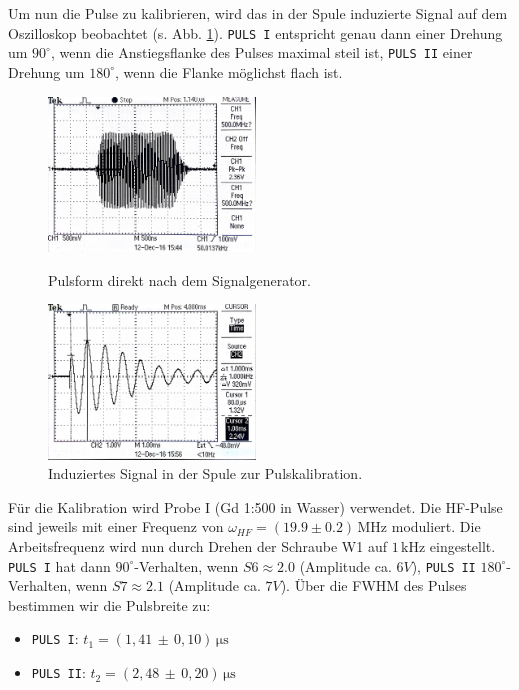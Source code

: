 \documentclass[a4paper]{scrartcl} %
\newcommand{\err}[2]{( #1 \, \pm \, #2 )} %
\newcommand{\us}{\, \mathrm{\mu s}}
\newcommand{\khz}{\, \mathrm{kHz}}
\newcommand{\mhz}{\, \mathrm{MHz}}
\begin{document}
Um nun die Pulse zu kalibrieren, wird das in der Spule induzierte Signal auf dem Oszilloskop beobachtet (s. Abb. \ref{fig:pulse_induced}). \texttt{PULS I} entspricht genau dann einer Drehung um $90^\circ$, wenn die Anstiegsflanke des Pulses maximal steil ist, \texttt{PULS II} einer Drehung um $180^\circ$, wenn die Flanke möglichst flach ist.
\newline
\begin{figure}[H]
	\centering
	\parbox{60mm}{
		\centering
		\includegraphics[width=55mm]{./Resources/pulse_train.jpg}
		\caption{Pulsform direkt nach dem Signalgenerator.}
		\label{fig:pulse_signal}
	}
	\hfill  %
	\parbox{60mm}{
		\centering
		\includegraphics[width=55mm]{./Resources/single_pulse_event.jpg}
		\caption{Induziertes Signal in der Spule zur Pulskalibration.}
		\label{fig:pulse_induced}
	}
\end{figure}

Für die Kalibration wird Probe I (Gd 1:500 in Wasser) verwendet. Die HF-Pulse sind jeweils mit einer Frequenz von $\omega_{HF} = (19.9 \pm 0.2) \mhz$ moduliert. Die Arbeitsfrequenz wird nun durch Drehen der Schraube W1 auf $1\khz$ eingestellt. \texttt{PULS I} hat dann $90^\circ$-Verhalten, wenn $S6 \approx 2.0$ (Amplitude ca. $6V$), \texttt{PULS II} $180^\circ$-Verhalten, wenn $S7 \approx 2.1$ (Amplitude ca. $7V$). Über die FWHM des Pulses bestimmen wir die Pulsbreite zu:
\begin{itemize}
	\item[] \texttt{PULS I}: $t_1=\err{1,41}{0,10}\us$
	\item[] \texttt{PULS II}: $t_2=\err{2,48}{0,20}\us$
\end{itemize}
\end{document}
